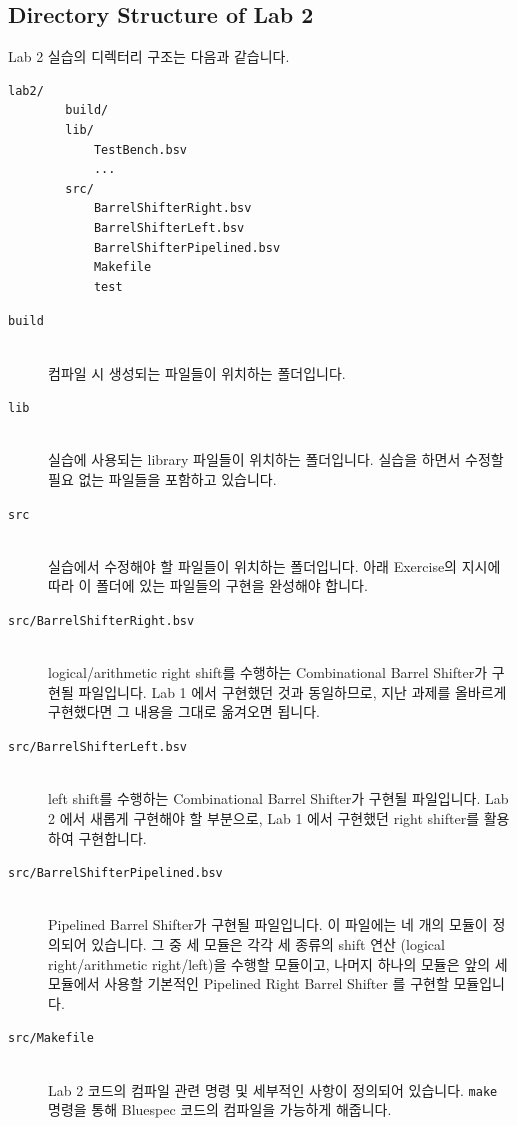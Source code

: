 \documentclass{article}
\begin{document}
\subsection{Directory Structure of Lab 2}
Lab 2 실습의 디렉터리 구조는 다음과 같습니다.

\begin{Verbatim}[frame=single]
    lab2/	
        build/
        lib/
            TestBench.bsv
            ...
        src/
            BarrelShifterRight.bsv
            BarrelShifterLeft.bsv
            BarrelShifterPipelined.bsv
            Makefile
            test
\end{Verbatim}

\begin{description}
\item [\texttt{build}]\hfill \ \\
컴파일 시 생성되는 파일들이 위치하는 폴더입니다.

\item [\texttt{lib}]\hfill \ \\
	실습에 사용되는 library 파일들이 위치하는 폴더입니다.
	실습을 하면서 수정할 필요 없는 파일들을 포함하고 있습니다.

\item [\texttt{src}]\hfill \ \\ 
	실습에서 수정해야 할 파일들이 위치하는 폴더입니다.
	아래 Exercise의 지시에 따라 이 폴더에 있는 파일들의 구현을 완성해야 합니다.

\item [\texttt{src/BarrelShifterRight.bsv}]\hfill \ \\
	logical/arithmetic right shift를 수행하는 Combinational Barrel Shifter가 구현될 파일입니다.
	Lab 1 에서 구현했던 것과 동일하므로, 지난 과제를 올바르게 구현했다면 그 내용을 그대로 옮겨오면 됩니다.

\item [\texttt{src/BarrelShifterLeft.bsv}]\hfill \ \\
	left shift를 수행하는 Combinational Barrel Shifter가 구현될 파일입니다. 
	Lab 2 에서 새롭게 구현해야 할 부분으로, Lab 1 에서 구현했던 right shifter를 활용하여 구현합니다. 

\item [\texttt{src/BarrelShifterPipelined.bsv}]\hfill \ \\
	Pipelined Barrel Shifter가 구현될 파일입니다. 이 파일에는 네 개의 모듈이 정의되어 있습니다.
	그 중 세 모듈은 각각 세 종류의 shift 연산 (logical right/arithmetic right/left)을 수행할 모듈이고, 
	나머지 하나의 모듈은 앞의 세 모듈에서 사용할 기본적인 Pipelined Right Barrel Shifter 를 구현할 모듈입니다.
\item [\texttt{src/Makefile}]\hfill \ \\
	Lab 2 코드의 컴파일 관련 명령 및 세부적인 사항이 정의되어 있습니다. \texttt{make} 명령을 통해
	Bluespec 코드의 컴파일을 가능하게 해줍니다.


\end{description}
\end{document}
